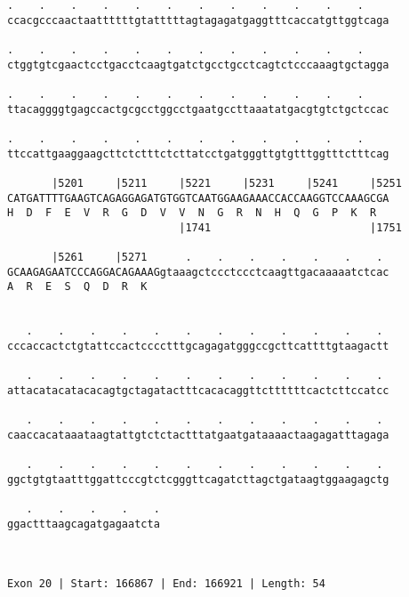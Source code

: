 \documentclass{article}
\begin{document}
\begin{Verbatim}
.    .    .    .    .    .    .    .    .    .    .    .    
ccacgcccaactaattttttgtatttttagtagagatgaggtttcaccatgttggtcaga
                                                            
.    .    .    .    .    .    .    .    .    .    .    .    
ctggtgtcgaactcctgacctcaagtgatctgcctgcctcagtctcccaaagtgctagga
                                                            
.    .    .    .    .    .    .    .    .    .    .    .    
ttacaggggtgagccactgcgcctggcctgaatgccttaaatatgacgtgtctgctccac
                                                            
.    .    .    .    .    .    .    .    .    .    .    .    
ttccattgaaggaagcttctctttctcttatcctgatgggttgtgtttggtttctttcag
                                                            
       |5201     |5211     |5221     |5231     |5241     |5251
CATGATTTTGAAGTCAGAGGAGATGTGGTCAATGGAAGAAACCACCAAGGTCCAAAGCGA
H  D  F  E  V  R  G  D  V  V  N  G  R  N  H  Q  G  P  K  R  
                           |1741                         |1751
  
       |5261     |5271      .    .    .    .    .    .    . 
GCAAGAGAATCCCAGGACAGAAAGgtaaagctccctccctcaagttgacaaaaatctcac
A  R  E  S  Q  D  R  K                                      
                                                            
  
   .    .    .    .    .    .    .    .    .    .    .    . 
cccaccactctgtattccactcccctttgcagagatgggccgcttcattttgtaagactt
                                                            
   .    .    .    .    .    .    .    .    .    .    .    . 
attacatacatacacagtgctagatactttcacacaggttcttttttcactcttccatcc
                                                            
   .    .    .    .    .    .    .    .    .    .    .    . 
caaccacataaataagtattgtctctactttatgaatgataaaactaagagatttagaga
                                                            
   .    .    .    .    .    .    .    .    .    .    .    . 
ggctgtgtaatttggattcccgtctcgggttcagatcttagctgataagtggaagagctg
                                                            
   .    .    .    .    .
ggactttaagcagatgagaatcta
                        
                        
 
Exon 20 | Start: 166867 | End: 166921 | Length: 54




\end{Verbatim}
\end{document}
